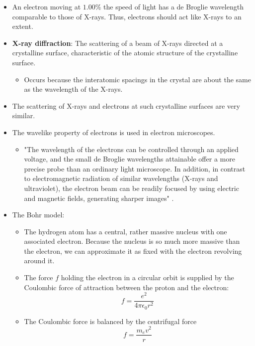 \documentclass[../notes.tex]{subfiles}
\begin{document}
\begin{itemize}
    \item An electron moving at $1.00\%$ the speed of light has a de Broglie wavelength comparable to those of X-rays. Thus, electrons should act like X-rays to an extent.
    \item \textbf{X-ray diffraction}: The scattering of a beam of X-rays directed at a crystalline surface, characteristic of the atomic structure of the crystalline surface.
    \begin{itemize}
        \item Occurs because the interatomic spacings in the crystal are about the same as the wavelength of the X-rays.
    \end{itemize}
    \item The scattering of X-rays and electrons at such crystalline surfaces are very similar.
    \item The wavelike property of electrons is used in electron microscopes.
    \begin{itemize}
        \item "The wavelength of the electrons can be controlled through an applied voltage, and the small de Broglie wavelengths attainable offer a more precise probe than an ordinary light microscope. In addition, in contrast to electromagnetic radiation of similar wavelengths (X-rays and ultraviolet), the electron beam can be readily focused by using electric and magnetic fields, generating sharper images" \parencite[18]{bib:McQuarrieSimon}.
    \end{itemize}
    \item The Bohr model:
    \begin{itemize}
        \item The hydrogen atom has a central, rather massive nucleus with one associated electron. Because the nucleus is so much more massive than the electron, we can approximate it as fixed with the electron revolving around it.
        \item The force $f$ holding the electron in a circular orbit is supplied by the Coulombic force of attraction between the proton and the electron:
        \begin{equation*}
            f = \frac{e^2}{4\pi\epsilon_0r^2}
        \end{equation*}
        \item The Coulombic force is balanced by the centrifugal force
        \begin{equation*}
            f = \frac{m_ev^2}{r}
        \end{equation*}

\end{itemize}
\end{itemize}
\end{document}
